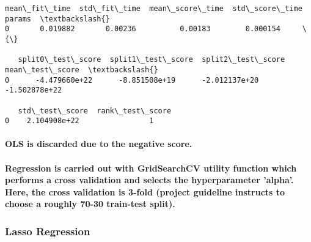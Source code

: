 \documentclass[11pt]{article}
\makeatletter
\newcommand{\boxspacing}{\kern\kvtcb@left@rule\kern\kvtcb@boxsep}
\newcommand{\prompt}[4]{
        \ttfamily\llap{{\color{#2}[#3]:\hspace{3pt}#4}}\vspace{-\baselineskip}
    }
\makeatother
\begin{document}
            \begin{tcolorbox}[breakable, size=fbox, boxrule=.5pt, pad at break*=1mm, opacityfill=0]
\prompt{Out}{outcolor}{53}{\boxspacing}
\begin{Verbatim}[commandchars=\\\{\}]
   mean\_fit\_time  std\_fit\_time  mean\_score\_time  std\_score\_time params  \textbackslash{}
0       0.019882       0.00236          0.00183        0.000154     \{\}

   split0\_test\_score  split1\_test\_score  split2\_test\_score  mean\_test\_score  \textbackslash{}
0      -4.479660e+22      -8.851508e+19      -2.012137e+20    -1.502878e+22

   std\_test\_score  rank\_test\_score
0    2.104908e+22                1
\end{Verbatim}
\end{tcolorbox}
        
    \paragraph{OLS is discarded due to the negative
score.}\label{ols-is-discarded-due-to-the-negative-score.}

    \paragraph{Regression is carried out with GridSearchCV utility function
which performs a cross validation and selects the hyperparameter
'alpha'. Here, the cross validation is 3-fold (project guideline
instructs to choose a roughly 70-30 train-test
split).}\label{regression-is-carried-out-with-gridsearchcv-utility-function-which-performs-a-cross-validation-and-selects-the-hyperparameter-alpha.-here-the-cross-validation-is-3-fold-project-guideline-instructs-to-choose-a-roughly-70-30-train-test-split.}

\subsubsection{Lasso Regression}\label{lasso-regression}
\end{document}
